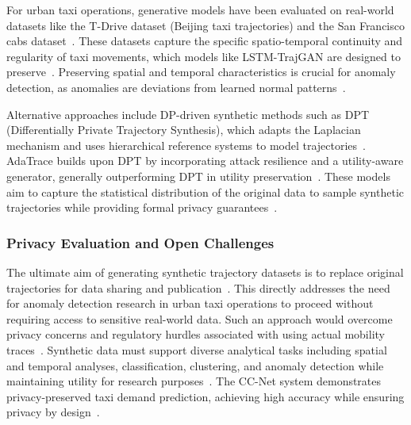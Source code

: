 \documentclass[runningheads]{llncs}
\begin{document}
For urban taxi operations, generative models have been evaluated on real-world datasets like the T-Drive dataset (Beijing taxi trajectories) and the San Francisco cabs dataset~\cite{Ma2021TrajectoryPrivacy,Primault2014DPLPP,Primault2019LongRoad}. These datasets capture the specific spatio-temporal continuity and regularity of taxi movements, which models like LSTM-TrajGAN are designed to preserve~\cite{Rao2021LSTMTrajGAN,Liu2018TrajGANs,Jin2023SurveyExpStudy}. Preserving spatial and temporal characteristics is crucial for anomaly detection, as anomalies are deviations from learned normal patterns~\cite{Rao2021LSTMTrajGAN,Naghizade2020PrivacyContextAware}.

Alternative approaches include DP-driven synthetic methods such as DPT (Differentially Private Trajectory Synthesis), which adapts the Laplacian mechanism and uses hierarchical reference systems to model trajectories~\cite{Chen2011DPTP,Jin2023SurveyExpStudy}. AdaTrace builds upon DPT by incorporating attack resilience and a utility-aware generator, generally outperforming DPT in utility preservation~\cite{Jin2023SurveyExpStudy}. These models aim to capture the statistical distribution of the original data to sample synthetic trajectories while providing formal privacy guarantees~\cite{Jin2023SurveyExpStudy,Qu2020GANs5G}.

\subsubsection{Privacy Evaluation and Open Challenges}

The ultimate aim of generating synthetic trajectory datasets is to replace original trajectories for data sharing and publication~\cite{Buchholz2024SoK,Rao2021LSTMTrajGAN,Liu2018TrajGANs}. This directly addresses the need for anomaly detection research in urban taxi operations to proceed without requiring access to sensitive real-world data. Such an approach would overcome privacy concerns and regulatory hurdles associated with using actual mobility traces~\cite{Buchholz2024SoK,Rao2021LSTMTrajGAN,Liu2018TrajGANs}. Synthetic data must support diverse analytical tasks including spatial and temporal analyses, classification, clustering, and anomaly detection while maintaining utility for research purposes~\cite{Rao2021LSTMTrajGAN,Chen2011DPTP}. The CC-Net system demonstrates privacy-preserved taxi demand prediction, achieving high accuracy while ensuring privacy by design~\cite{Ozeki2023PPTP}.
\end{document}

